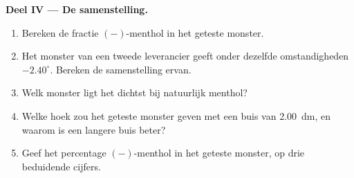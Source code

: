 \begin{problem}
\medskip
\noindent\textbf{Deel IV --- De samenstelling.}
\begin{enumerate}[resume]
  \item Bereken de fractie $(-)$-menthol in het geteste monster.
  \item Het monster van een tweede leverancier geeft onder dezelfde
        omstandigheden $-2.40^\circ$. Bereken de samenstelling ervan.
  \item Welk monster ligt het dichtst bij natuurlijk menthol?
  \item Welke hoek zou het geteste monster geven met een buis van
        \qty{2.00}{dm}, en waarom is een langere buis beter?
  \item Geef het percentage $(-)$-menthol in het geteste monster, op drie
        beduidende cijfers.
\end{enumerate}
\end{problem}
